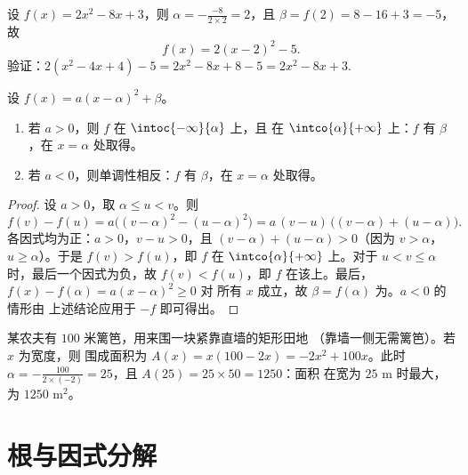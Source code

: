 \begin{example}\label{ex:g11:quad:canonical}
设 $f(x) = 2x^2 - 8x + 3$，则 $\alpha = -\frac{-8}{2 \times 2} = 2$，且
$\beta = f(2) = 8 - 16 + 3 = -5$，故
\[
f(x) = 2(x - 2)^2 - 5 .
\]
验证：$2(x^2 - 4x + 4) - 5 = 2x^2 - 8x + 8 - 5 =
2x^2 - 8x + 3$.
\end{example}

\begin{proposition}[极值与单调性]\label{prop:g11:quad:variations}
设 $f(x) = a(x-\alpha)^2 + \beta$。
\begin{enumerate}
  \item 若 $a > 0$，则 $f$ 在 $\intoc{-\infty}{\alpha}$ 上，且
        在 $\intco{\alpha}{+\infty}$ 上：$f$ 有\emph{}
        $\beta$，在 $x = \alpha$ 处取得。
  \item 若 $a < 0$，则单调性相反：$f$ 有\emph{}
        $\beta$，在 $x = \alpha$ 处取得。
\end{enumerate}
\end{proposition}

\begin{proof}
设 $a > 0$，取 $\alpha \leq u < v$。则
\[
f(v) - f(u) = a\bigl((v-\alpha)^2 - (u-\alpha)^2\bigr)
= a\,(v - u)\,\bigl((v-\alpha) + (u-\alpha)\bigr).
\]
各因式均为正：$a > 0$，$v - u > 0$，且
$(v-\alpha) + (u-\alpha) > 0$（因为 $v > \alpha$，$u \geq \alpha$）。于是
$f(v) > f(u)$，即 $f$ 在 $\intco{\alpha}{+\infty}$ 上。对于
$u < v \leq \alpha$ 时，最后一个因式为负，故 $f(v) < f(u)$，即 $f$
在该上。最后，$f(x) - f(\alpha) = a(x-\alpha)^2 \geq 0$ 对
所有 $x$ 成立，故 $\beta = f(\alpha)$ 为。$a < 0$ 的情形由
上述结论应用于 $-f$ 即可得出。
\end{proof}

\begin{example}
某农夫有 $100$ 米篱笆，用来围一块紧靠直墙的矩形田地
（靠墙一侧无需篱笆）。若 $x$ 为宽度，则
围成面积为 $A(x) = x(100 - 2x) = -2x^2 + 100x$。此时 $\alpha =
-\frac{100}{2\times(-2)} = 25$，且 $A(25) = 25 \times 50 = 1250$：面积
在宽为 $25$ m 时最大，为 $1250$ m$^2$。
\end{example}

\section{根与因式分解}

